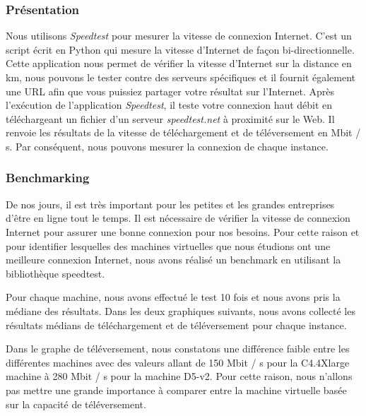 \documentclass[11pt]{article}
\begin{document}
\subsubsection{Présentation}
Nous utilisons \textit{Speedtest} pour mesurer la vitesse de connexion Internet. C'est un script écrit en Python qui mesure la vitesse d'Internet de façon bi-directionnelle. Cette application nous permet de vérifier la vitesse d'Internet sur la distance en km, nous pouvons le tester contre des serveurs spécifiques et il fournit également une URL afin que vous puissiez partager votre résultat sur l'Internet. Après l'exécution de l'application \textit{Speedtest}, il teste votre connexion haut débit en téléchargeant un fichier d'un serveur \textit{speedtest.net} à proximité sur le Web. Il renvoie les résultats de la vitesse de téléchargement et de téléversement en Mbit / s. Par conséquent, nous pouvons mesurer la connexion de chaque instance.

\subsubsection{Benchmarking}
De nos jours, il est très important pour les petites et les grandes entreprises d'être en ligne tout le temps. Il est nécessaire de vérifier la vitesse de connexion Internet pour assurer une bonne connexion pour nos besoins. Pour cette raison et pour identifier lesquelles des machines virtuelles que nous étudions ont une meilleure connexion Internet, nous avons réalisé un benchmark en utilisant la bibliothèque speedtest.

Pour chaque machine, nous avons effectué le test 10 fois et nous avons pris la médiane des résultats. Dans les deux graphiques suivants, nous avons collecté les résultats médians de téléchargement et de téléversement pour chaque instance.

Dans le graphe de téléversement, nous constatons une différence faible entre les différentes machines avec des valeurs allant de 150 Mbit / s pour la C4.4Xlarge machine à 280 Mbit / s pour la machine D5-v2. Pour cette raison, nous n'allons pas mettre une grande importance à comparer entre la machine virtuelle basée sur la capacité de téléversement.
\end{document}
